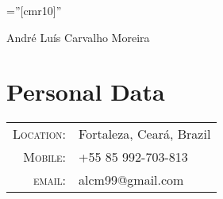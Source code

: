 \documentclass[a4paper,10pt]{article}
\begin{document}

  \pagestyle{empty} %

  \font\fb=''[cmr10]'' %

  \par{\centering
  {\Huge André Luís \Huge{Carvalho} Moreira
  }\bigskip\par}

  \section{Personal Data}

  \begin{tabular}{rl}
    \textsc{Location:}   & Fortaleza, Ceará, Brazil \\
    \textsc{Mobile:}     & +55 85 992-703-813\\
    \textsc{email:}     & {alcm99@gmail.com}
  \end{tabular} \\

\end{document}

